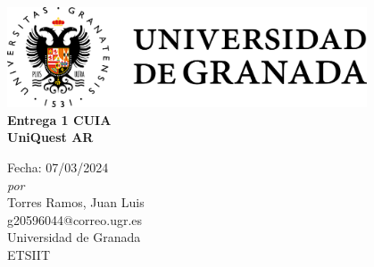 \documentclass{article}
\begin{document}
\begin{center}
  \vspace*{0.5\baselineskip} %
  \includegraphics[width=0.8\textwidth]{ugr-2.png}\\
  \vfill
  {\Huge \textbf{Entrega 1 CUIA}}\\ %
  \vspace*{3\baselineskip}
  {\LARGE \textbf{UniQuest AR}}\\
  \begin{large}
    \vspace*{2\baselineskip}
    Fecha: 07/03/2024\\
    \vspace*{1\baselineskip}
    \emph{por} \\[1ex]
    {\Large Torres Ramos, Juan Luis \\}
	\vspace*{0.5\baselineskip}
    {{ g20596044@correo.ugr.es}}\\[1cm]
    \vfill
	{Universidad de Granada}\\
    {\large ETSIIT}\par
	\vspace*{3\baselineskip}
  \end{large}
  \thispagestyle{empty} 
\end{center}
\pagebreak









\setcounter{page}{1}
\end{document}
